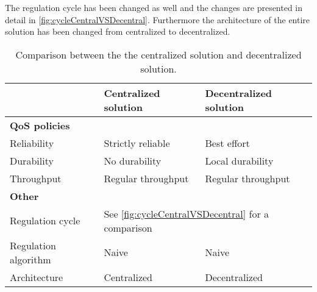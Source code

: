 The regulation cycle has been changed as well and the changes are presented in detail in \cref{fig:cycleCentralVSDecentral}. Furthermore the architecture of the entire solution has been changed from centralized to decentralized.

\begin{table}[!t]
	\begin{tabular}{l l l}
		\hline
		\hline
		~ & \textbf{Centralized solution} & \textbf{Decentralized solution} \\
		\hline
		\hline
		\multicolumn{3}{l}{\textbf{QoS policies}} \\
		\hline
		Reliability & Strictly reliable & Best effort \\
		\hline
		Durability & No durability & Local durability \\
		\hline
		Throughput & Regular throughput & Regular throughput \\
		\hline
		\hline
		\multicolumn{3}{l}{\textbf{Other}} \\
		\hline
		\hline
		Regulation cycle & \multicolumn{2}{l}{See \cref{fig:cycleCentralVSDecentral} for a comparison} \\
		\hline
		Regulation algorithm & Naive & Naive \\
		\hline
		Architecture & Centralized & Decentralized \\
		\hline
		\hline
	\end{tabular}
	
	\caption[Comparison between the the centralized solution and decentralized solution]{
		\label{tab:decentralizedVScentralized}
		\footnotesize{%
			Comparison between the the centralized solution and decentralized solution.
		} 
	}
\end{table}